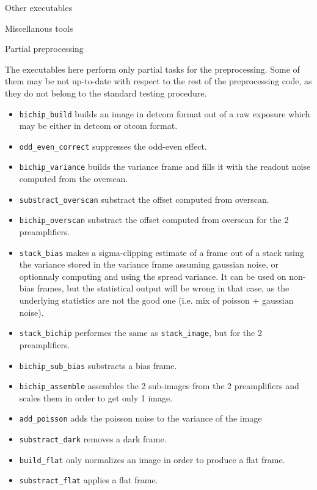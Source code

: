 \begin{subsection}{Other executables}
\begin{subsubsection}{Miscellanous tools}
\end{subsubsection}

\begin{subsubsection}{Partial preprocessing}

The executables here perform only partial tasks for the preprocessing.
Some of them may be not up-to-date with respect to the rest of the
preprocessing code, as they do not belong to the standard testing procedure.
\begin{itemize}
\item {\tt bichip\_build} builds an image in detcom format out of a raw
exposure which may be either in detcom or otcom format.
\item {\tt odd\_even\_correct} suppresses the odd-even effect.
\item {\tt bichip\_variance} builds the variance frame and fills it
with the readout noise computed from the overscan.
\item {\tt substract\_overscan} substract the offset computed from overscan.
\item {\tt bichip\_overscan} substract the offset computed from
overscan for the 2 preamplifiers.
\item {\tt stack\_bias} makes a sigma-clipping estimate of a frame out
of a stack using the variance stored in the variance frame assuming
gaussian noise, or
optionnaly computing and using the spread variance. It can be used on
non-bias frames, but 
the statistical output will be wrong in that case, as the underlying
statistics are not the good one (i.e. mix of poisson + gaussian
noise).
\item {\tt stack\_bichip} performes the same as {\tt stack\_image}, but
for the 2 preamplifiers.
\item {\tt bichip\_sub\_bias} substracts a bias frame.
\item {\tt bichip\_assemble} assembles the 2 sub-images from the 2
preamplifiers and scales them in order to get only 1 image.
\item {\tt add\_poisson} adds the poisson noise to the variance of the
image
\item {\tt substract\_dark} removes a dark frame.
\item {\tt build\_flat} only normalizes an image in order to produce a
flat frame.
\item {\tt substract\_flat} applies a flat frame.
\end{itemize}
\end{subsubsection}

\end{subsection}

